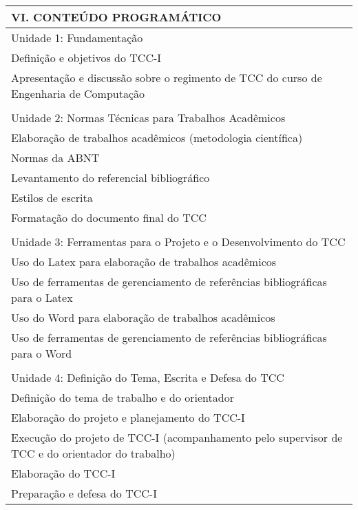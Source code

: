 \documentclass[12pt]{article}
\begin{document}
\begin{longtable}{|L{1.025\textwidth}|} \hline
%
{\bf VI. CONTEÚDO PROGRAMÁTICO } \\ \hline
Unidade 1: Fundamentação \\
Definição e objetivos do TCC-I\\
Apresentação e discussão sobre o regimento de TCC do curso de Engenharia de Computação\\
\\
Unidade 2: Normas Técnicas para Trabalhos Acadêmicos \\
Elaboração de trabalhos acadêmicos (metodologia científica)\\
Normas da ABNT\\
Levantamento do referencial bibliográfico\\
Estilos de escrita\\
Formatação do documento final do TCC\\
\\
Unidade 3: Ferramentas para o Projeto e o Desenvolvimento do TCC \\
Uso do Latex para elaboração de trabalhos acadêmicos\\
Uso de ferramentas de gerenciamento de referências bibliográficas para o Latex\\
Uso do Word para elaboração de trabalhos acadêmicos\\
Uso de ferramentas de gerenciamento de referências bibliográficas para o Word\\
\\
Unidade 4: Definição do Tema, Escrita e Defesa do TCC \\
Definição do tema de trabalho e do orientador\\
Elaboração do projeto e planejamento do TCC-I\\
Execução do projeto de TCC-I (acompanhamento pelo supervisor de TCC e do orientador do trabalho)\\
Elaboração do TCC-I\\
Preparação e defesa do TCC-I
\\ \hline
\end{longtable} 

\end{document}
